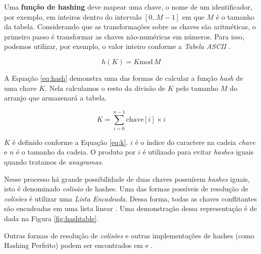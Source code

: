 Uma \textbf{função de hashing} deve mapear uma chave, o nome de um
identificador, por exemplo, em inteiros dentro do intervalo $[0..M-1]$ em
que $M$ é o tamanho da tabela. Considerando que as transformações sobre
as chaves são aritméticas, o primeiro passo é transformar as chaves
não-numéricas em números. Para isso, podemos utilizar, por exemplo, o valor
inteiro conforme a \emph{Tabela ASCII} \cite{ziviani}.

\begin{equation} \label{eq:hash}
h(K) = K \text{mod} \, M
\end{equation}

A Equação \ref{eq:hash} demonstra uma das formas de calcular a função
\emph{hash} de uma chave $K$. Nela calculamos o resto da divisão de $K$
pelo tamanho $M$ do arranjo que armazenará a tabela.

\begin{equation} \label{eq:k}
K = \sum_{i=0}^{n-1}\text{chave}[i] \times i
\end{equation}

$K$ é definido conforme a Equação \ref{eq:k}. $i$ é o índice do caractere na
cadeia \emph{chave} e $n$ é o tamanho da cadeia. O produto por $i$ é utilizado
para evitar \emph{hashes} iguais quando tratamos de \emph{anagramas}.

Nesse processo há grande possibilidade de duas chaves possuírem \emph{hashes}
iguais, isto é denominado \emph{colisão} de hashes. Uma das formas possíveis
de resolução de \emph{colisões} é utilizar uma \emph{Lista Encadeada}. Dessa
forma, todas as chaves conflitantes são encadeadas em uma lista linear
\cite{ziviani}. Uma demonstração dessa representação é de dada na Figura
\ref{fig:hashtable}.

Outras formas de resolução de \emph{colisões} e outras implementações de
hashes (como Hashing Perfeito) podem ser encontrados em  e
.

